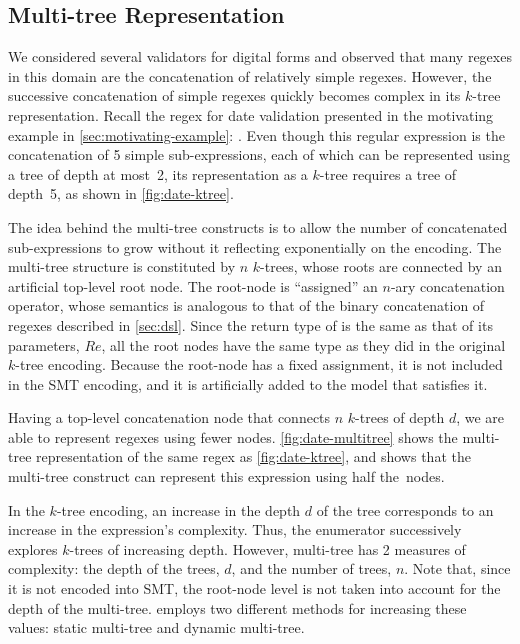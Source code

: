 \subsection{Multi-tree Representation}
We considered several validators for digital forms and observed that many regexes in this domain are the concatenation of relatively simple regexes. However, the successive concatenation of simple regexes quickly becomes complex in its \(k\)-tree representation.
%
Recall the regex for date validation presented in the motivating example in \autoref{sec:motivating-example}: .
%
Even though this regular expression is the concatenation of 5 simple sub-expressions, each of which can be represented using a tree of depth at most~2, its representation as a {\(k\)-tree} requires a tree of depth~5, as shown in \autoref{fig:date-ktree}.



The idea behind the multi-tree constructs is to allow the number of concatenated sub-expressions to grow without it reflecting exponentially on the encoding. The multi-tree structure is constituted by \(n\) \(k\)-trees, whose roots are connected by an artificial top-level root node. The root-node is ``assigned'' an \(n\)-ary concatenation operator, whose semantics is analogous to that of the binary concatenation of regexes described in \autoref{sec:dsl}. Since the return type of \Concat{} is the same as that of its parameters, \(Re\), all the root nodes have the same type as they did in the original \(k\)-tree encoding. %
Because the root-node has a fixed assignment, it is not included in the \ac{SMT} encoding, and it is artificially added to the model that satisfies it.

Having a top-level concatenation node that connects \(n\) \(k\)-trees of depth \(d\), we are able to represent regexes using fewer nodes. \autoref{fig:date-multitree} shows the multi-tree representation of the same regex as \autoref{fig:date-ktree}, and shows that the multi-tree construct can represent this expression using half the~nodes.

In the \(k\)-tree encoding, an increase in the depth \(d\) of the tree corresponds to an increase in the expression's complexity. Thus, the enumerator successively explores \(k\)-trees of increasing depth. However, multi-tree has 2 measures of complexity: the depth of the trees, \(d\), and the number of trees, \(n\). Note that, since it is not encoded into \ac{SMT}, the root-node level is not taken into account for the depth of the multi-tree. \Forest{} employs two different methods for increasing these values: static multi-tree and dynamic multi-tree.

